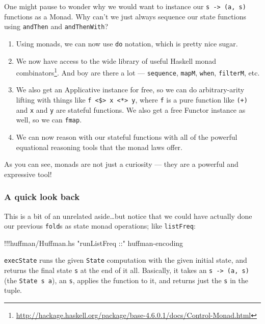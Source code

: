\documentclass[]{article}
\newenvironment{Shaded}{}{}
\newcommand{\StringTok}[1]{\textcolor[rgb]{0.25,0.44,0.63}{{#1}}}
\newcommand{\FunctionTok}[1]{\textcolor[rgb]{0.02,0.16,0.49}{{#1}}}
\newcommand{\NormalTok}[1]{{#1}}
\renewcommand{\href}[2]{#2\footnote{\url{#1}}}
\begin{document}
One might pause to wonder why we would want to instance our
\texttt{s\ -\textgreater{}\ (a,\ s)} functions as a Monad. Why can't we
just always sequence our state functions using \texttt{andThen} and
\texttt{andThenWith}?

\begin{enumerate}
\def\labelenumi{\arabic{enumi}.}
\item
  Using monads, we can now use \texttt{do} notation, which is pretty
  nice sugar.
\item
  We now have access to the wide library of useful Haskell
  \href{http://hackage.haskell.org/package/base-4.6.0.1/docs/Control-Monad.html}{monad
  combinators}. And boy are there a lot --- \texttt{sequence},
  \texttt{mapM}, \texttt{when}, \texttt{filterM}, etc.
\item
  We also get an Applicative instance for free, so we can do
  arbitrary-arity lifting with things like
  \texttt{f\ \textless{}\$\textgreater{}\ x\ \textless{}*\textgreater{}\ y},
  where \texttt{f} is a pure function like \texttt{(+)} and \texttt{x}
  and \texttt{y} are stateful functions. We also get a free Functor
  instance as well, so we can \texttt{fmap}.
\item
  We can now reason with our stateful functions with all of the powerful
  equational reasoning tools that the monad laws offer.
\end{enumerate}

As you can see, monads are not just a curiosity --- they are a powerful
and expressive tool!

\subsubsection{A quick look back}\label{a-quick-look-back}

This is a bit of an unrelated aside\ldots{}but notice that we could have
actually done our previous \texttt{fold}s as state monad operations;
like \texttt{listFreq}:

\begin{Shaded}
\begin{Highlighting}[]
\FunctionTok{!!!}\NormalTok{huffman}\FunctionTok{/}\NormalTok{Huffman.hs }\StringTok{"runListFreq ::"} \NormalTok{huffman}\FunctionTok{-}\NormalTok{encoding}
\end{Highlighting}
\end{Shaded}

\texttt{execState} runs the given \texttt{State} computation with the
given initial state, and returns the final state \texttt{s} at the end
of it all. Basically, it takes an \texttt{s\ -\textgreater{}\ (a,\ s)}
(the \texttt{State\ s\ a}), an \texttt{s}, applies the function to it,
and returns just the \texttt{s} in the tuple.
\end{document}
